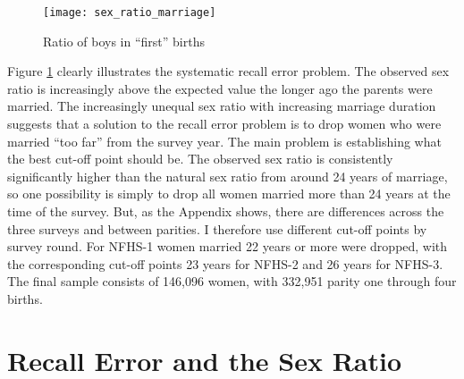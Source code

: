 \documentclass[12pt,letterpaper]{article}
\begin{document}
\begin{figure}[htp]%
\centering
\texttt{[image: sex\_ratio\_marriage]}
\caption{Ratio of boys in ``first'' births}
\label{fig:sexRatioMarriage}
\end{figure}


Figure \ref{fig:sexRatioMarriage} clearly illustrates the systematic recall error
problem.
The observed sex ratio is increasingly above the expected value the
longer ago the parents were married.
The increasingly unequal sex ratio with increasing marriage duration suggests that
a solution to the recall error problem is to drop women who were married ``too far'' from 
the survey year.
The main problem is establishing what the best cut-off point should be.
The observed sex ratio is consistently significantly higher than the natural sex ratio 
from around 24 years of marriage, so one possibility is simply to drop all women married 
more than 24 years at the time of the survey.
But, as the Appendix shows, there are differences across the three surveys and between 
parities.
I therefore use different cut-off points by survey round.
For NFHS-1 women married 22 years or more were dropped, with the corresponding cut-off 
points 23 years for NFHS-2  and 26 years for NFHS-3.
The final sample consists of 146,096 women, with 332,951 parity one through four births.



\section{Recall Error and the Sex Ratio}

\setcounter{figure}{0}
\setcounter{table}{0}


% 
\end{document}
